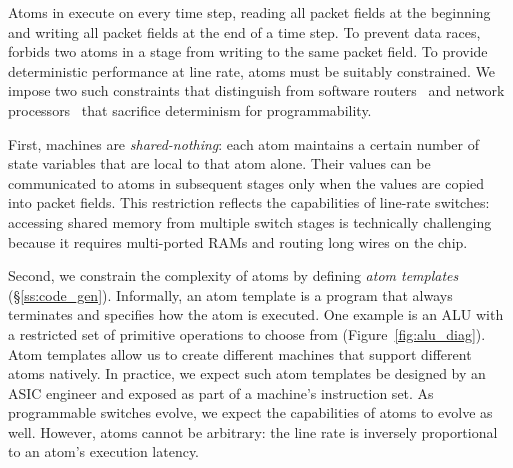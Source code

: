 
Atoms in \absmachine execute on every time step, reading all packet fields at
the beginning and writing all packet fields at the end of a time step. To
prevent data races, \absmachine forbids two atoms in a stage from writing to
the same packet field.  To provide deterministic performance at line rate,
atoms must be suitably constrained.  We impose two such constraints that
distinguish \absmachine from software routers~\cite{click} and network
processors~\cite{ixp4xx} that sacrifice determinism for programmability.

First, \absmachine machines are \textit{shared-nothing}: each atom maintains a
certain number of state variables that are local to that atom alone. Their
values can be communicated to atoms in subsequent stages only when the values
are copied into packet fields. This restriction reflects the capabilities of
line-rate switches: accessing shared memory from multiple switch stages is
technically challenging because it requires multi-ported RAMs and routing long
wires on the chip.

Second, we constrain the complexity of atoms by defining {\it atom templates}
(\S\ref{ss:code_gen}).  Informally, an atom template is a program that always
terminates and specifies how the atom is executed. One example is an ALU with a
restricted set of primitive operations to choose from
(Figure~\ref{fig:alu_diag}). Atom templates allow us to create different
\absmachine machines that support different atoms natively. In practice, we
expect such atom templates be designed by an ASIC engineer and exposed as part
of a \absmachine machine's instruction set. As programmable switches evolve, we
expect the capabilities of atoms to evolve as well. However, atoms cannot be
arbitrary: the line rate is inversely proportional to an atom's execution
latency.
